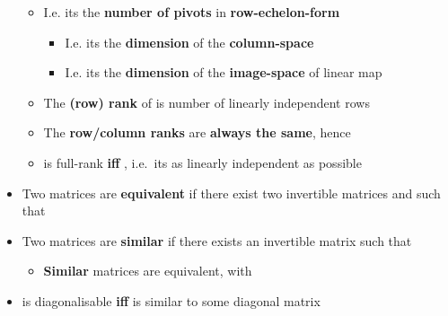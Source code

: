 \begin{itemize}
        \begin{itemize}

          \item
                I.e. its the \textbf{number of pivots} in \textbf{row-echelon-form}

                \begin{itemize}

                  \item
                        I.e. its the \textbf{dimension} of the \textbf{column-space}
                  \item
                        I.e. its the \textbf{dimension} of the \textbf{image-space}
                         of linear map
                \end{itemize}
          \item
                The \textbf{(row) rank} of  is number of linearly
                independent rows
          \item
                The \textbf{row/column ranks} are \textbf{always the same}, hence
          \item
                 is full-rank \textbf{iff}
                , i.e.~its as linearly independent
                as possible
        \end{itemize}
  \item
        Two matrices
        are \textbf{equivalent} if there exist two invertible matrices
          and
         such that
  \item
        Two matrices
        are \textbf{similar} if there exists an invertible matrix
          such that

        \begin{itemize}

          \item
                \textbf{Similar} matrices are equivalent, with
        \end{itemize}
  \item
         is diagonalisable \textbf{iff}  is similar to some
        diagonal matrix 
\end{itemize}

